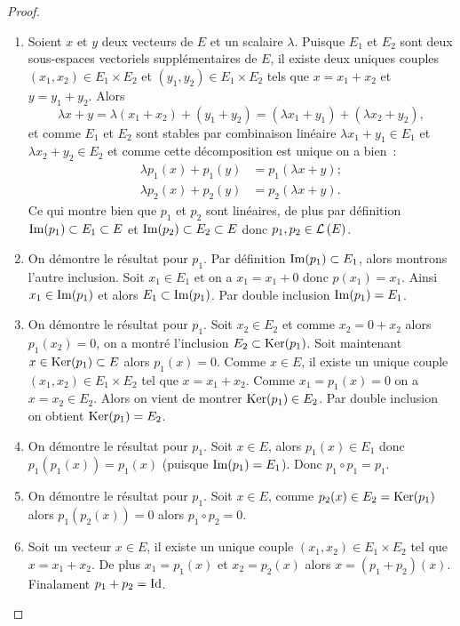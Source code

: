\begin{proof}
  \begin{enumerate}
    \item
      Soient \(x\) et \(y\) deux vecteurs de \(E\) et un scalaire \(\lambda\).
      Puisque \(E_1\) et \(E_2\) sont deux sous-espaces vectoriels
      supplémentaires de \(E\), il existe deux uniques couples \((x_1,x_2) \in
      E_1 \times E_2\) et \((y_1,y_2) \in E_1 \times E_2\) tels que
      \(x=x_1+x_2\) et \(y=y_1+y_2\). Alors
      \begin{equation}
        \lambda x +y= \lambda (x_1+x_2) + (y_1+y_2) = (\lambda x_1+y_1) +
        (\lambda x_2 +y_2),
      \end{equation}
      et comme \(E_1\) et \(E_2\) sont stables par combinaison linéaire
      \(\lambda x_1+y_1 \in E_1\) et \(\lambda x_2 +y_2 \in E_2\) et comme cette
      décomposition est unique on a bien~:
      \begin{align}
        \lambda p_1(x)+p_1(y) &= p_1(\lambda x+y); \\
        \lambda p_2(x)+p_2(y) &= p_2(\lambda x+y).
      \end{align}
      Ce qui montre bien que \(p_1\) et \(p_2\) sont linéaires, de plus par
      définition \(\operatorname{Im}(p_1) \subset E_1 \subset E\) et \(\operatorname{Im}(p_2) \subset
      E_2 \subset E\) donc \(p_1,p_2 \in \mathcal{L}\left(E\right)\).
    \item On démontre le résultat pour \(p_1\). Par définition \(\operatorname{Im}(p_1)
      \subset E_1\), alors montrons l'autre inclusion. Soit \(x_1 \in E_1\) et
      on a \(x_1 = x_1+0\) donc \(p(x_1)=x_1\). Ainsi \(x_1 \in \operatorname{Im}(p_1)\) et
      alors \(E_1 \subset \operatorname{Im}(p_1)\). Par double inclusion
      \(\operatorname{Im}(p_1)=E_1\).
    \item On démontre le résultat pour \(p_1\). Soit \(x_2 \in E_2\) et comme
      \(x_2=0+x_2\) alors \(p_1(x_2)=0\), on a montré l'inclusion \(E_2 \subset
      \operatorname{Ker}(p_1)\). Soit maintenant \(x \in \operatorname{Ker}(p_1) \subset E\) alors
      \(p_1(x)=0\). Comme \(x \in E\), il existe un unique couple \((x_1,x_2)
      \in E_1 \times E_2\) tel que \(x=x_1+x_2\). Comme \(x_1=p_1(x)=0\) on a
      \(x=x_2 \in E_2\). Alors on vient de montrer \(\operatorname{Ker}(p_1) \in E_2\). Par
      double inclusion on obtient \(\operatorname{Ker}(p_1)=E_2\).
    \item On démontre le résultat pour \(p_1\). Soit \(x \in E\), alors \(p_1(x)
      \in E_1\) donc \(p_1(p_1(x))=p_1(x)\) (puisque \(\operatorname{Im}(p_1)=E_1\)). Donc
      \(p_1 \circ p_1=p_1\).
    \item On démontre le résultat pour \(p_1\). Soit \(x \in E\), comme \(p_2(x)
      \in E_2 = \operatorname{Ker}(p_1)\) alors \(p_1(p_2(x))=0\) alors \(p_1 \circ p_2=0\).
    \item Soit un vecteur \(x \in E\), il existe un unique couple \((x_1,x_2)
      \in E_1 \times E_2\) tel que \(x=x_1+x_2\). De plus \(x_1=p_1(x)\) et
      \(x_2=p_2(x)\) alors \(x=(p_1+p_2)(x)\). Finalament \(p_1+p_2 = \operatorname{Id}\).
  \end{enumerate}
\end{proof}

